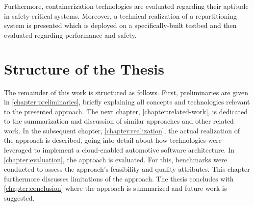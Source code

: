 Furthermore, containerization technologies are evaluated regarding their aptitude in safety-critical systems. Moreover, a technical realization of a repartitioning system is presented which is deployed on a specifically-built testbed and then evaluated regarding performance and safety.

%
%
%
%
%
%
%
%
%
%


\section{Structure of the Thesis}

The remainder of this work is structured as follows. First, preliminaries are given in \autoref{chapter:preliminaries}, briefly explaining all concepts and technologies relevant to the presented approach. The next chapter, \autoref{chapter:related-work}, is dedicated to the summarization and discussion of similar approaches and other related work. In the subsequent chapter, \autoref{chapter:realization}, the actual realization of the approach is described, going into detail about how technologies were leveraged to implement a cloud-enabled automotive software architecture. In \autoref{chapter:evaluation}, the approach is evaluated. For this, benchmarks were conducted to assess the approach's feasibility and quality attributes. This chapter furthermore discusses limitations of the approach. The thesis concludes with \autoref{chapter:conclusion} where the approach is summarized and future work is suggested.

%
%
%
%
%
%
%
%
%
%
%
%
%
%
%
%
%
%
%
%
%
%
%
%
%
%
%
%
%
%
%
%
%
%
%
%
%
%
